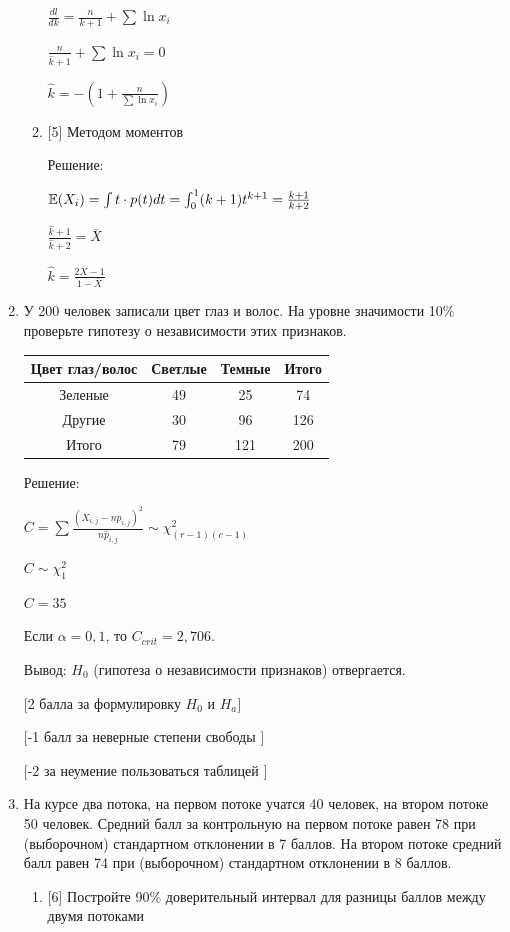 \documentclass[12pt, a4paper]{article}\usepackage[]{graphicx}\usepackage[]{color}
\begin{document}
\begin{enumerate}
\begin{enumerate}
$\frac{dl}{dk}=\frac{n}{k+1}+\sum \ln{x_{i}}$

$\frac{n}{\hat{k}+1}+\sum \ln{x_{i}}=0$

$\hat{k}=-\left(1+\frac{n}{\sum \ln{x_{i}}} \right)$
\item{} [5] Методом моментов

Решение:

$\mathbb{E}(X_{i})=\int t\cdot p(t)dt=\int_{0}^{1} (k+1)t^{k+1}=\frac{k+1}{k+2}$

$\frac{\hat{k}+1}{\hat{k}+2}=\bar{X}$

$\hat{k}=\frac{2\bar{X}-1}{1-\bar{X}}$
\end{enumerate}

\item У 200 человек записали цвет глаз и волос. На уровне значимости
10\% проверьте гипотезу о независимости этих признаков.

\begin{tabular}{|c|c|c|c|}
  \hline
  Цвет глаз/волос & Светлые & Темные & Итого \\
  \hline
  Зеленые & 49 & 25 & 74 \\
  Другие & 30 & 96 & 126 \\
  \hline
  Итого & 79 & 121 & 200 \\
  \hline
\end{tabular}

Решение:

$C=\sum \frac{(X_{i,j}-n \hat{p}_{i,j})^{2}}{n\hat{p}_{i,j}}\sim \chi_{(r-1)(c-1)}^{2}$

$C\sim \chi_{1}^{2}$

$C=35$

Если $\alpha=0,1$, то $C_{crit}=2,706$.

Вывод: $H_{0}$ (гипотеза о независимости признаков) отвергается.

$[$2 балла за формулировку $H_{0}$ и $H_{a}]$

$[$-1 балл за неверные степени свободы $]$

$[$-2 за неумение пользоваться таблицей $]$

\item На курсе два потока, на первом потоке учатся 40 человек, на втором
потоке 50 человек. Средний балл за контрольную на первом потоке
равен 78 при (выборочном) стандартном отклонении в 7 баллов. На
втором потоке средний балл равен 74 при (выборочном) стандартном
отклонении в 8 баллов.
\begin{enumerate}
\item{} [6] Постройте 90\% доверительный интервал для разницы баллов
между
двумя потоками


\end{enumerate}
\end{enumerate}
\end{document}
